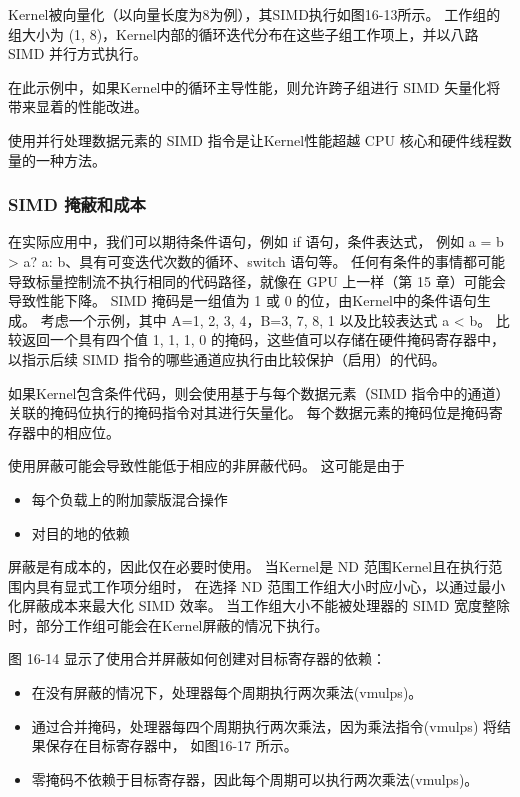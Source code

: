Kernel被向量化（以向量长度为8为例），其SIMD执行如图16-13所示。 
工作组的组大小为 (1, 8)，Kernel内部的循环迭代分布在这些子组工作项上，并以八路 SIMD 并行方式执行。

在此示例中，如果Kernel中的循环主导性能，则允许跨子组进行 SIMD 矢量化将带来显着的性能改进。

使用并行处理数据元素的 SIMD 指令是让Kernel性能超越 CPU 核心和硬件线程数量的一种方法。

\subsubsection{SIMD 掩蔽和成本}
在实际应用中，我们可以期待条件语句，例如 if 语句，条件表达式，
例如 a = b > a? a: b、具有可变迭代次数的循环、switch 语句等。 
任何有条件的事情都可能导致标量控制流不执行相同的代码路径，就像在 GPU 上一样（第 15 章）可能会导致性能下降。 
SIMD 掩码是一组值为 1 或 0 的位，由Kernel中的条件语句生成。 
考虑一个示例，其中 A={1, 2, 3, 4}，B={3, 7, 8, 1} 以及比较表达式 a < b。 
比较返回一个具有四个值 {1, 1, 1, 0} 的掩码，这些值可以存储在硬件掩码寄存器中，
以指示后续 SIMD 指令的哪些通道应执行由比较保护（启用）的代码。

如果Kernel包含条件代码，则会使用基于与每个数据元素（SIMD 指令中的通道）关联的掩码位执行的掩码指令对其进行矢量化。 
每个数据元素的掩码位是掩码寄存器中的相应位。

使用屏蔽可能会导致性能低于相应的非屏蔽代码。 这可能是由于

\begin{itemize}
	\item 每个负载上的附加蒙版混合操作

	\item 对目的地的依赖
\end{itemize}

屏蔽是有成本的，因此仅在必要时使用。 当Kernel是 ND 范围Kernel且在执行范围内具有显式工作项分组时，
在选择 ND 范围工作组大小时应小心，以通过最小化屏蔽成本来最大化 SIMD 效率。 
当工作组大小不能被处理器的 SIMD 宽度整除时，部分工作组可能会在Kernel屏蔽的情况下执行。

图 16-14 显示了使用合并屏蔽如何创建对目标寄存器的依赖：

\begin{itemize}
	\item 在没有屏蔽的情况下，处理器每个周期执行两次乘法(vmulps)。

	\item 通过合并掩码，处理器每四个周期执行两次乘法，因为乘法指令(vmulps) 将结果保存在目标寄存器中，
	如图16-17 所示。

	\item 零掩码不依赖于目标寄存器，因此每个周期可以执行两次乘法(vmulps)。
\end{itemize}

